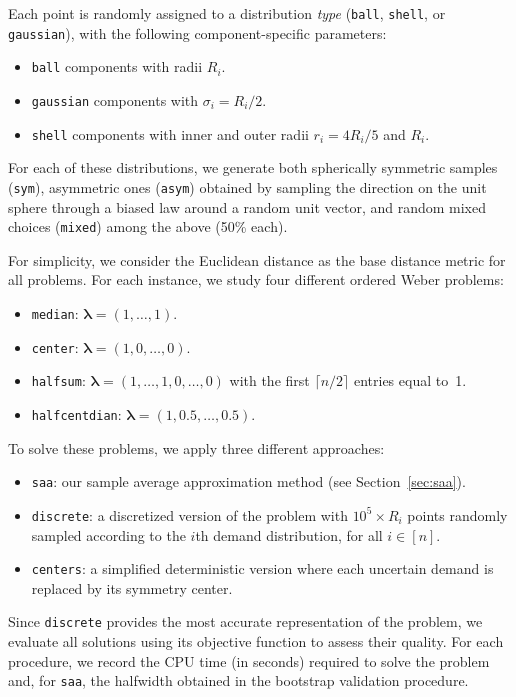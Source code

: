 \documentclass[letter,11pt, reqno]{amsart}
\renewcommand{\;}{\quad}
\theoremstyle{thmstyleone}%
\theoremstyle{thmstyletwo}%
\theoremstyle{thmstylethree}%
\begin{document}
Each point is randomly assigned to a distribution \emph{type} (\texttt{ball}, \texttt{shell}, or \texttt{gaussian}), with the following component-specific parameters:
\begin{itemize}
\item \texttt{ball} components with radii  $R_i$.
    \item \texttt{gaussian} components with  $\sigma_i = R_i/2$.
    \item \texttt{shell} components with inner and outer radii
    $r_i = 4R_i/5$ and $R_i$.
\end{itemize}
For each of these distributions, we generate both spherically symmetric samples (\texttt{sym}), asymmetric ones (\texttt{asym}) obtained by sampling the direction on the unit sphere through a biased law around a random unit vector, and random mixed choices (\texttt{mixed}) among the above (50\% each). 

For simplicity, we consider the Euclidean distance as the base distance metric for all problems. For each instance, we study four different ordered Weber problems:
\begin{itemize}
    \item \texttt{median}: $\boldsymbol{\lambda} = (1, \ldots, 1)$.
    \item \texttt{center}: $\boldsymbol{\lambda} = (1, 0, \ldots, 0)$.
    \item \texttt{halfsum}: $\boldsymbol{\lambda} = (1, \ldots, 1, 0, \ldots, 0)$ with the first $\lceil n/2 \rceil$ entries equal to~1.
    \item \texttt{halfcentdian}: $\boldsymbol{\lambda} = (1, 0.5, \ldots, 0.5)$.
\end{itemize}
To solve these problems, we apply three different approaches:
\begin{itemize}
    \item \texttt{saa}: our sample average approximation method (see Section~\ref{sec:saa}).
    \item \texttt{discrete}: a discretized version of the problem with $10^{5}\times R_i$ points randomly sampled according to the $i$th demand distribution, for all $i\in [n]$.
    \item \texttt{centers}: a simplified deterministic version where each uncertain demand is replaced by its symmetry center.
\end{itemize}
Since \texttt{discrete} provides the most accurate representation of the problem, we evaluate all solutions using its objective function to assess their quality. For each procedure, we record the CPU time (in seconds) required to solve the problem and, for \texttt{saa}, the halfwidth obtained in the bootstrap validation procedure.
\end{document}
